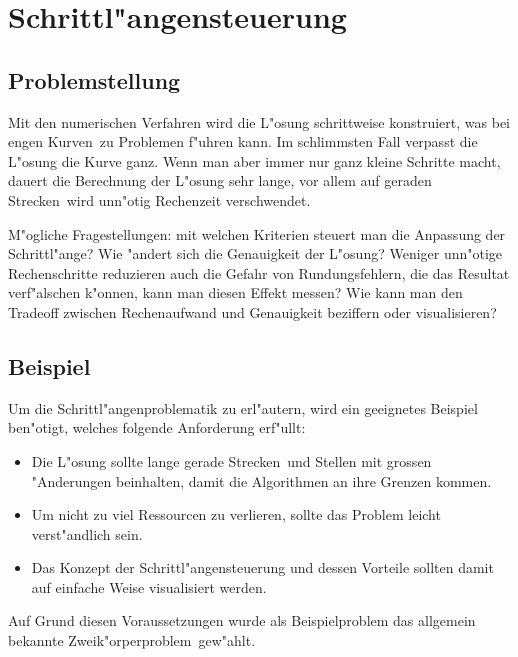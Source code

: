 \chapter{Schrittl"angensteuerung\label{chapter:thema}}
\begin{refsection}
\printbibliography[heading=subbibliography]


\section{Problemstellung}

Mit den numerischen Verfahren wird die L"osung schrittweise konstruiert, was bei \glqq engen Kurven\grqq~zu Problemen f"uhren kann.
Im schlimmsten Fall verpasst die L"osung die Kurve ganz.
Wenn man aber immer nur ganz kleine Schritte macht, dauert die Berechnung der L"osung sehr lange, vor allem auf \glqq geraden Strecken\grqq~wird unn"otig Rechenzeit verschwendet.

M"ogliche Fragestellungen: mit welchen Kriterien steuert man die Anpassung der Schrittl"ange?
Wie "andert sich die Genauigkeit der L"osung?
Weniger unn"otige Rechenschritte reduzieren auch die Gefahr von Rundungsfehlern, die das Resultat verf"alschen k"onnen, kann man diesen Effekt messen?
Wie kann man den Tradeoff zwischen Rechenaufwand und Genauigkeit beziffern oder visualisieren?


\section{Beispiel}

Um die Schrittl"angenproblematik zu erl"autern, wird ein geeignetes Beispiel ben"otigt, welches folgende Anforderung erf"ullt: 
\begin{itemize}
\item Die L"osung sollte \glqq lange gerade Strecken\grqq~und Stellen mit grossen "Anderungen beinhalten, damit die Algorithmen an ihre Grenzen kommen.
\item Um nicht zu viel Ressourcen zu verlieren, sollte das Problem leicht verst"andlich sein.
\item Das Konzept der Schrittl"angensteuerung und dessen Vorteile sollten damit auf einfache Weise visualisiert werden.
\end{itemize}
Auf Grund diesen Voraussetzungen wurde als Beispielproblem das allgemein bekannte \glqq Zweik"orperproblem\grqq~gew"ahlt.


\end{refsection}
